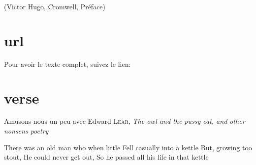 \documentclass{book}
\begin{document}
(Victor Hugo, Cromwell, Préface)

\section{url}
Pour avoir le texte complet, suivez le lien: %

\section{verse}

Amusons-nous un peu avec Edward \textsc{Lear}, \emph{The owl and the pussy cat, and other nonsens poetry}

There was an old man who when little
Fell casually into a kettle
	But, growing too stout,
	He could never get out,
So he passed all his life in that kettle
\end{document}
